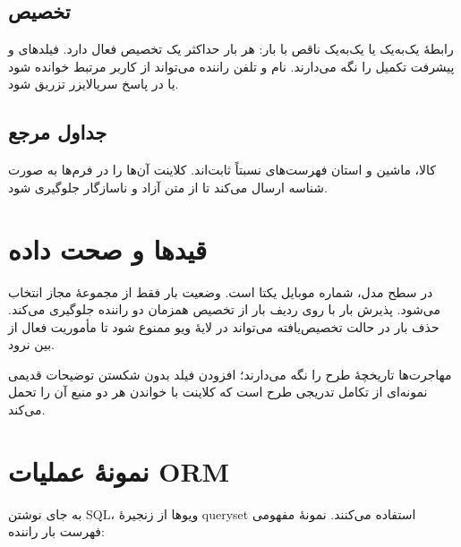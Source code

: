 \subsection{تخصیص}
رابطهٔ یک‌به‌یک یا یک‌به‌یک ناقص با بار: هر بار حداکثر یک تخصیص فعال دارد. فیلدهای  و  پیشرفت تکمیل را نگه می‌دارند. نام و تلفن راننده می‌تواند از کاربر مرتبط خوانده شود یا در پاسخ سریالایزر تزریق شود.

\subsection{جداول مرجع}
کالا، ماشین و استان فهرست‌های نسبتاً ثابت‌اند. کلاینت آن‌ها را در فرم‌ها به صورت شناسه ارسال می‌کند تا از متن آزاد و ناسازگار جلوگیری شود.

\section{قیدها و صحت داده}

در سطح مدل، شماره موبایل یکتا است. وضعیت بار فقط از مجموعهٔ مجاز انتخاب می‌شود. پذیرش بار با  روی ردیف بار از تخصیص همزمان دو راننده جلوگیری می‌کند. حذف بار در حالت تخصیص‌یافته می‌تواند در لایهٔ ویو ممنوع شود تا مأموریت فعال از بین نرود.

مهاجرت‌ها تاریخچهٔ طرح را نگه می‌دارند؛ افزودن فیلد  بدون شکستن توضیحات قدیمی نمونه‌ای از تکامل تدریجی طرح است که کلاینت با خواندن هر دو منبع آن را تحمل می‌کند.

\section{نمونهٔ عملیات ORM}

به جای نوشتن \textenglish{SQL}، ویوها از زنجیرهٔ queryset استفاده می‌کنند. نمونهٔ مفهومی فهرست بار راننده:

\medskip
\begingroup
\setlength{\fboxsep}{8pt}
\setlength{\fboxrule}{0.4pt}
\noindent{}
\endgroup

